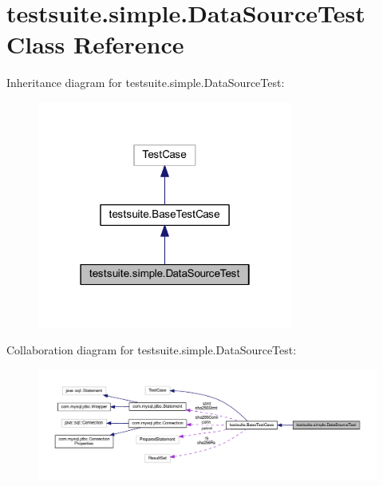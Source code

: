 \hypertarget{classtestsuite_1_1simple_1_1_data_source_test}{}\section{testsuite.\+simple.\+Data\+Source\+Test Class Reference}
\label{classtestsuite_1_1simple_1_1_data_source_test}


Inheritance diagram for testsuite.\+simple.\+Data\+Source\+Test\+:
\nopagebreak
\begin{figure}[H]
\begin{center}
\leavevmode
\includegraphics[width=238pt]{classtestsuite_1_1simple_1_1_data_source_test__inherit__graph}
\end{center}
\end{figure}


Collaboration diagram for testsuite.\+simple.\+Data\+Source\+Test\+:
\nopagebreak
\begin{figure}[H]
\begin{center}
\leavevmode
\includegraphics[width=350pt]{classtestsuite_1_1simple_1_1_data_source_test__coll__graph}
\end{center}
\end{figure}
